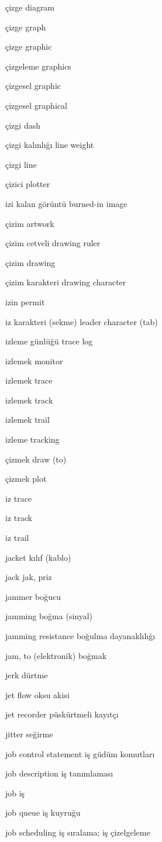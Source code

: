 \documentclass[12pt,fleqn]{article}\usepackage{../../common}
\begin{document}
çizge diagram

çizge graph

çizge graphic

çizgeleme graphics

çizgesel graphic

çizgesel graphical

çizgi dash

çizgi kalınlığı line weight

çizgi line

çizici plotter

izi kalan görüntü burned-in image

çizim artwork

çizim cetveli drawing ruler

çizim drawing

çizim karakteri drawing character

izin permit

iz karakteri (sekme) leader character (tab)

izleme günlüğü trace log

izlemek monitor

izlemek trace

izlemek track

izlemek trail

izleme tracking

çizmek draw (to)

çizmek plot

iz trace

iz track

iz trail

jacket kılıf (kablo)

jack jak, priz

jammer boğucu

jamming boğma (sinyal)

jamming resistance boğulma dayanaklılığı

jam, to (elektronik) boğmak

jerk dürtme

jet flow oksu akisi

jet recorder püskürtmeli kayıtçı

jitter seğirme

job control statement iş güdüm komutları

job description iş tanımlaması

job iş

job queue iş kuyruğu

job scheduling iş sıralama; iş çizelgeleme
\end{document}
